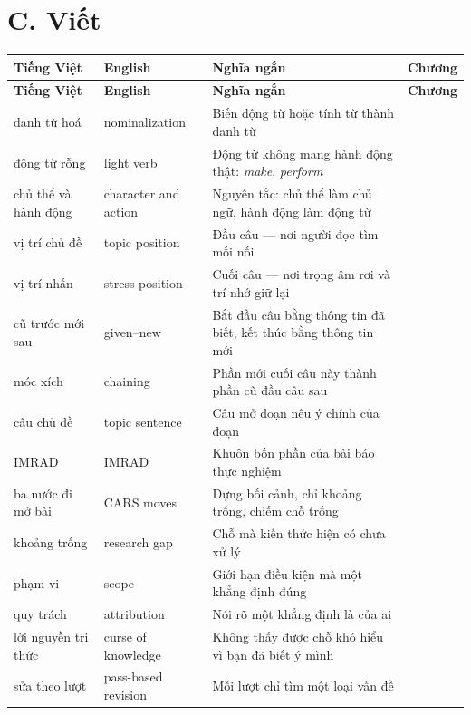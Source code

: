 \documentclass[english.tex]{subfiles}
\begin{document}
\section*{C. Viết}
\begin{center}\footnotesize
{}
\begin{longtable}{@{}L{3.4cm}L{3.8cm}L{6.6cm}L{1.5cm}@{}}
\toprule
\textbf{Tiếng Việt} & \textbf{English} & \textbf{Nghĩa ngắn} & \textbf{Chương}\\
\midrule
\endfirsthead
\toprule
\textbf{Tiếng Việt} & \textbf{English} & \textbf{Nghĩa ngắn} & \textbf{Chương}\\
\midrule
\endhead
danh từ hoá & nominalization & Biến động từ hoặc tính từ thành danh từ & \\
động từ rỗng & light verb & Động từ không mang hành động thật: \emph{make}, \emph{perform} & \\
chủ thể và hành động & character and action & Nguyên tắc: chủ thể làm chủ ngữ, hành động làm động từ & \\
vị trí chủ đề & topic position & Đầu câu --- nơi người đọc tìm mối nối & \\
vị trí nhấn & stress position & Cuối câu --- nơi trọng âm rơi và trí nhớ giữ lại & \\
cũ trước mới sau & given--new & Bắt đầu câu bằng thông tin đã biết, kết thúc bằng thông tin mới & \\
móc xích & chaining & Phần mới cuối câu này thành phần cũ đầu câu sau & \\
câu chủ đề & topic sentence & Câu mở đoạn nêu ý chính của đoạn & \\
IMRAD & IMRAD & Khuôn bốn phần của bài báo thực nghiệm & \\
ba nước đi mở bài & CARS moves & Dựng bối cảnh, chỉ khoảng trống, chiếm chỗ trống & \\
khoảng trống & research gap & Chỗ mà kiến thức hiện có chưa xử lý & \\
phạm vi & scope & Giới hạn điều kiện mà một khẳng định đúng & \\
quy trách & attribution & Nói rõ một khẳng định là của ai & \\
lời nguyền tri thức & curse of knowledge & Không thấy được chỗ khó hiểu vì bạn đã biết ý mình & \\
sửa theo lượt & pass-based revision & Mỗi lượt chỉ tìm một loại vấn đề & \\
\bottomrule
\end{longtable}
\end{center}
\end{document}
